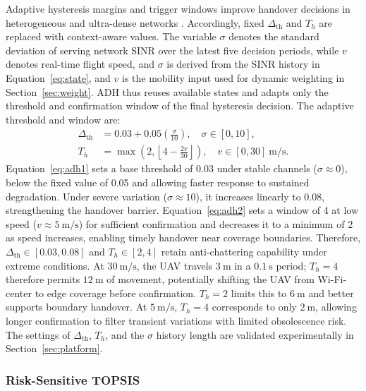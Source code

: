\documentclass[remotesensing,article,submit,moreauthors]{Definitions/mdpi}
\begin{document}
Adaptive hysteresis margins and trigger windows improve handover decisions in heterogeneous and ultra-dense networks \citep{ref28,ref29,ref30,ref31}. Accordingly, fixed $\Delta_{\mathrm{th}}$ and $T_h$ are replaced with context-aware values. The variable $\sigma$ denotes the standard deviation of serving network SINR over the latest five decision periods, while $v$ denotes real-time flight speed, and $\sigma$ is derived from the SINR history in Equation~\eqref{eq:state}, and $v$ is the mobility input used for dynamic weighting in Section~\ref{sec:weight}. ADH thus reuses available states and adapts only the threshold and confirmation window of the final hysteresis decision. The adaptive threshold and window are:
\begin{align}
\Delta_{\mathrm{th}} &= 0.03+0.05\left(\frac{\sigma}{10}\right),\quad \sigma\in[0,10], \label{eq:adh1}\\
T_h &= \max\left(2,\left\lfloor4-\frac{2v}{30}\right\rfloor\right),\quad v\in[0,30]~\mathrm{m/s}. \label{eq:adh2}
\end{align}
Equation~\eqref{eq:adh1} sets a base threshold of 0.03 under stable channels ($\sigma\approx0$), below the fixed value of 0.05 and allowing faster response to sustained degradation. Under severe variation ($\sigma\approx10$), it increases linearly to 0.08, strengthening the handover barrier. Equation~\eqref{eq:adh2} sets a window of 4 at low speed ($v\approx5~\mathrm{m/s}$) for sufficient confirmation and decreases it to a minimum of 2 as speed increases, enabling timely handover near coverage boundaries. Therefore, $\Delta_{\mathrm{th}}\in[0.03,0.08]$ and $T_h\in[2,4]$ retain anti-chattering capability under extreme conditions. At $30~\mathrm{m/s}$, the UAV travels $3~\mathrm{m}$ in a $0.1~\mathrm{s}$ period; $T_h=4$ therefore permits $12~\mathrm{m}$ of movement, potentially shifting the UAV from Wi-Fi-center to edge coverage before confirmation. $T_h=2$ limits this to $6~\mathrm{m}$ and better supports boundary handover. At $5~\mathrm{m/s}$, $T_h=4$ corresponds to only $2~\mathrm{m}$, allowing longer confirmation to filter transient variations with limited obsolescence risk. The settings of $\Delta_{\mathrm{th}}$, $T_h$, and the $\sigma$ history length are validated experimentally in Section~\ref{sec:platform}.

\subsubsection{Risk-Sensitive TOPSIS}\label{sec:rstopsis}
\end{document}
